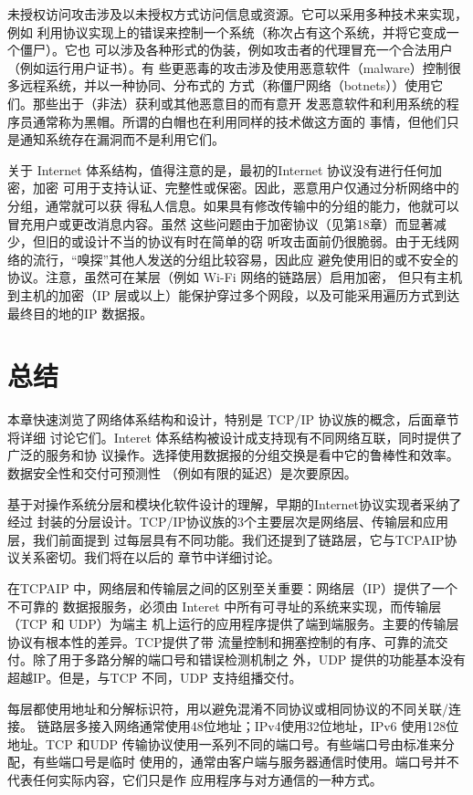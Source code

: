未授权访问攻击涉及以未授权方式访问信息或资源。它可以采用多种技术来实现，例如
利用协议实现上的错误来控制一个系统（称次占有这个系统，并将它变成一个僵尸）。它也
可以涉及各种形式的伪装，例如攻击者的代理冒充一个合法用户（例如运行用户证书）。有
些更恶毒的攻击涉及使用恶意软件（malware）控制很多远程系统，并以一种协同、分布式的
方式（称僵尸网络（botnets））使用它们。那些出于（非法）获利或其他恶意目的而有意开
发恶意软件和利用系统的程序员通常称为黑帽。所谓的白帽也在利用同样的技术做这方面的
事情，但他们只是通知系统存在漏洞而不是利用它们。

关于 Internet 体系结构，值得注意的是，最初的Internet 协议没有进行任何加密，加密
可用于支持认证、完整性或保密。因此，恶意用户仅通过分析网络中的分组，通常就可以获
得私人信息。如果具有修改传输中的分组的能力，他就可以冒充用户或更改消息内容。虽然
这些问题由于加密协议（见第18章）而显著减少，但旧的或设计不当的协议有时在简单的窃
听攻击面前仍很脆弱。由于无线网络的流行，“嗅探”其他人发送的分组比较容易，因此应
避免使用旧的或不安全的协议。注意，虽然可在某层（例如 Wi-Fi 网络的链路层）启用加密，
但只有主机到主机的加密（IP 层或以上）能保护穿过多个网段，以及可能采用遍历方式到达
最终目的地的IP 数据报。

\section{总结}
本章快速浏览了网络体系结构和设计，特别是 TCP/IP 协议族的概念，后面章节将详细
讨论它们。Interet 体系结构被设计成支持现有不同网络互联，同时提供了广泛的服务和协
议操作。选择使用数据报的分组交换是看中它的鲁棒性和效率。数据安全性和交付可预测性
（例如有限的延迟）是次要原因。

基于对操作系统分层和模块化软件设计的理解，早期的Internet协议实现者采纳了经过
封装的分层设计。TCP/IP协议族的3个主要层次是网络层、传输层和应用层，我们前面提到
过每层具有不同功能。我们还提到了链路层，它与TCPAIP协议关系密切。我们将在以后的
章节中详细讨论。

在TCPAIP 中，网络层和传输层之间的区别至关重要：网络层（IP）提供了一个不可靠的
数据报服务，必须由 Interet 中所有可寻址的系统来实现，而传输层（TCP 和 UDP）为端主
机上运行的应用程序提供了端到端服务。主要的传输层协议有根本性的差异。TCP提供了带
流量控制和拥塞控制的有序、可靠的流交付。除了用于多路分解的端口号和错误检测机制之
外，UDP 提供的功能基本没有超越IP。但是，与TCP 不同，UDP 支持组播交付。

每层都使用地址和分解标识符，用以避免混淆不同协议或相同协议的不同关联/连接。
链路层多接入网络通常使用48位地址；IPv4使用32位地址，IPv6 使用128位地址。TCP
和UDP 传输协议使用一系列不同的端口号。有些端口号由标准来分配，有些端口号是临时
使用的，通常由客户端与服务器通信时使用。端口号并不代表任何实际内容，它们只是作
应用程序与对方通信的一种方式。

